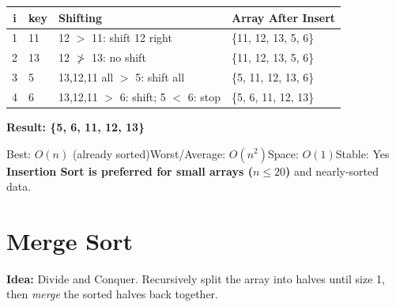 \documentclass[12pt,a4paper,oneside]{book}
\begin{document}
\begin{dryrun}[Dry Run: arr = \{12, 11, 13, 5, 6\}]
\begin{center}
\begin{tabular}{clll}
\toprule
\textbf{i} & \textbf{key} & \textbf{Shifting} & \textbf{Array After Insert}\\
\midrule
1 & 11 & 12 $>$ 11: shift 12 right         & \{11, 12, 13, 5, 6\}\\
2 & 13 & 12 $\not>$ 13: no shift           & \{11, 12, 13, 5, 6\}\\
3 & 5  & 13,12,11 all $>$ 5: shift all     & \{5, 11, 12, 13, 6\}\\
4 & 6  & 13,12,11 $>$ 6: shift; 5 $<$ 6: stop & \{5, 6, 11, 12, 13\}\\
\bottomrule
\end{tabular}
\end{center}
\textbf{Result: \{5, 6, 11, 12, 13\}}
\end{dryrun}

\begin{complexity}
Best: $O(n)$ (already sorted)\quad Worst/Average: $O(n^2)$\quad Space: $O(1)$\quad Stable: Yes\\[4pt]
\textbf{Insertion Sort is preferred for small arrays ($n \leq 20$)} and nearly-sorted data.
\end{complexity}

\section{Merge Sort}

\textbf{Idea:} Divide and Conquer. Recursively split the array into halves until size 1, then \textit{merge} the sorted halves back together.
\end{document}
